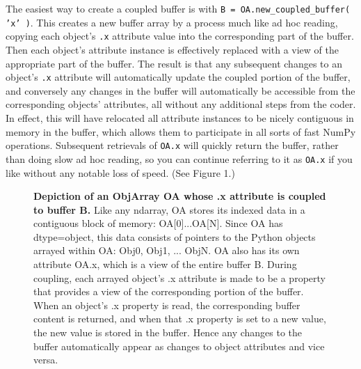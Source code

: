 \documentclass[letterpaper,compsoc,twoside]{IEEEtran}
\begin{document}
The easiest way to create a coupled buffer is with \texttt{B = OA.new\_coupled\_buffer( 'x' )}.  This creates a new \textquotedbl{}buffer\textquotedbl{} array by a process much like ad hoc reading, copying each object's \texttt{.x} attribute value into the corresponding part of the buffer.  Then each object's attribute instance is effectively replaced with a view of the appropriate part of the buffer.  The result is that any subsequent changes to an object's \texttt{.x} attribute will automatically update the coupled portion of the buffer, and conversely any changes in the buffer will automatically be accessible from the corresponding objects' attributes, all without any additional steps from the coder.  In effect, this will have relocated all attribute instances to be nicely contiguous in memory in the buffer, which allows them to participate in all sorts of fast NumPy operations. Subsequent retrievals of \texttt{OA.x} will quickly return the buffer, rather than doing slow ad hoc reading, so you can continue referring to it as \texttt{OA.x} if you like without any notable loss of speed.  (See Figure 1.)\begin{figure}[]\noindent{}
\caption{\textbf{Depiction of an ObjArray OA whose .x attribute is coupled to buffer B.}  Like any ndarray, OA stores its indexed data in a contiguous block of memory: OA{[}0{]}...OA{[}N{]}.  Since OA has dtype=object, this data consists of pointers to the Python objects arrayed \textquotedbl{}within\textquotedbl{} OA:  Obj0, Obj1, ... ObjN.  OA also has its own attribute OA.x, which is a view of the entire buffer B.  During coupling, each arrayed object's .x attribute is made to be a property that provides a view of the corresponding portion of the buffer.  When an object's .x property is read, the corresponding buffer content is returned, and when that .x property is set to a new value, the new value is stored in the buffer.  Hence any changes to the buffer automatically appear as changes to object attributes and vice versa.}
\end{figure}
\end{document}
